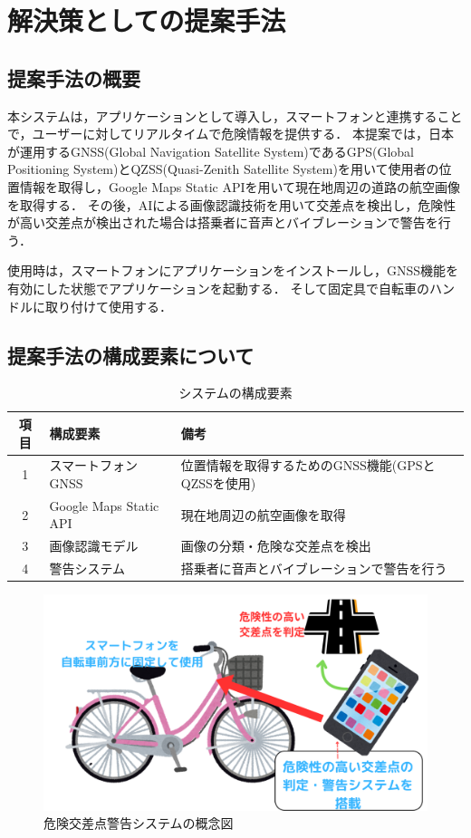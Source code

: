 \documentclass[uplatex,dvipdfmx]{jsarticle}
\begin{document}
\section{解決策としての提案手法}

\subsection{提案手法の概要}
本システムは，アプリケーションとして導入し，スマートフォンと連携することで，ユーザーに対してリアルタイムで危険情報を提供する．
本提案では，日本が運用するGNSS(Global Navigation Satellite System)であるGPS(Global Positioning System)とQZSS(Quasi-Zenith Satellite System)を用いて使用者の位置情報を取得し，Google Maps Static APIを用いて現在地周辺の道路の航空画像を取得する．
その後，AIによる画像認識技術を用いて交差点を検出し，危険性が高い交差点が検出された場合は搭乗者に音声とバイブレーションで警告を行う．

使用時は，スマートフォンにアプリケーションをインストールし，GNSS機能を有効にした状態でアプリケーションを起動する．
そして固定具で自転車のハンドルに取り付けて使用する．

\subsection{提案手法の構成要素について}

\begin{table}[H]
  \centering
  \caption{システムの構成要素}
  \label{tab:system_components}
  \begin{tabular}{|c|l|l|}
    \hline
    項目 & 構成要素 & 備考\\ \hline
    1 & スマートフォンGNSS & 位置情報を取得するためのGNSS機能(GPSとQZSSを使用) \\ \hline
    2 & Google Maps Static API & 現在地周辺の航空画像を取得 \\ \hline
    3 & 画像認識モデル & 画像の分類・危険な交差点を検出 \\ \hline
    4 & 警告システム & 搭乗者に音声とバイブレーションで警告を行う \\ \hline
  \end{tabular}
\end{table}

\begin{figure}[H]
  \centering
  \includegraphics[width=14cm]{./Figs/gainenzu_final.png}
  \caption{危険交差点警告システムの概念図}
  \label{fig:idea}
\end{figure}
\end{document}
